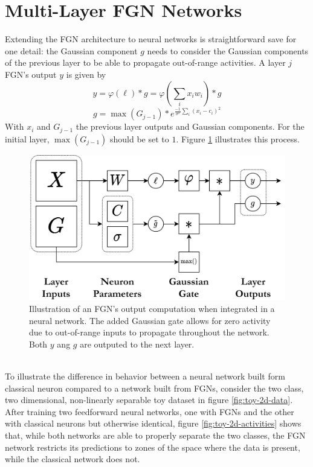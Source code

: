 \documentclass[12pt,oneside]{CUNY_PhD}
\begin{document}
\section{Multi-Layer FGN Networks}
Extending the FGN architecture to neural networks is straightforward save for one detail: the Gaussian component $g$ needs to consider the Gaussian components of the previous layer to be able to propagate out-of-range activities. A layer $j$ FGN's output $y$ is given by
\[y =  \varphi(\ell)*g = \varphi(\sum_i x_{i} w_{i}) * g\]
\[g = \max(G_{j-1}) * e^{\frac{-1}{\sigma^2}\sum_{i}(x_i-c_i)^2}\]
With $x_{i}$ and $G_{j-1}$ the previous layer outputs and Gaussian components. For the initial layer, $\max(G_{j-1})$ should be set to $1$. Figure \ref{fig:fgn-layer} illustrates this process.
\begin{figure}[!htbp]
    \centering
        \includegraphics[width=\textwidth]{images/multi-layer-fgn/FGN-Network.png}
    \caption{Illustration of an FGN's output computation when integrated in a neural network. The added Gaussian gate allows for zero activity due to out-of-range inputs to propagate throughout the network. Both $y$ ang $g$ are outputed to the next layer.}
    \label{fig:fgn-layer}
\end{figure}\\
To illustrate the difference in behavior between a neural network built form classical neuron compared to a network built from FGNs, consider the two class, two dimensional, non-linearly separable toy dataset in figure \ref{fig:toy-2d-data}. After training two feedforward neural networks, one with FGNs and the other with classical neurons but otherwise identical, figure \ref{fig:toy-2d-activities} shows that, while both networks are able to properly separate the two classes, the FGN network restricts its predictions to zones of the space where the data is present, while the classical network does not. 
\end{document}

